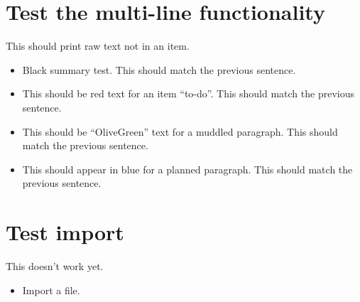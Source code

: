 \chapter{Test the multi-line functionality}
\label{autosec:7}
This should print raw text not in an item.
    \begin{itemize}[noitemsep]
        \item Black summary test.
This should match the previous sentence.
        \item {\color{red}This should be red text for an item ``to-do''.}
{\color{red}This should match the previous sentence.}
        \item {\color{OliveGreen}This should be ``OliveGreen'' text for a muddled paragraph.}
{\color{OliveGreen}This should match the previous sentence.}
        \item {\color{blue}This should appear in blue for a planned paragraph.}
{\color{blue}This should match the previous sentence.}
    \end{itemize}
\chapter{Test import}
\label{autosec:8}
This doesn't work yet.
    \begin{itemize}[noitemsep]
        \item {\color{red}Import a file.}
    \end{itemize}

